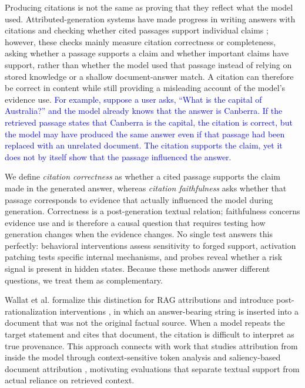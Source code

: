 \documentclass[a4paper,fleqn]{cas-sc}
\begin{document}
Producing citations is not the same as proving that they reflect what the model used. Attributed-generation systems have made progress in writing answers with citations and checking whether cited passages support individual claims \cite{gao2023citations,liu2023verifiability}; however, these checks mainly measure citation correctness or completeness, asking whether a passage supports a claim and whether important claims have support, rather than whether the model used that passage instead of relying on stored knowledge or a shallow document-answer match. A citation can therefore be correct in content while still providing a misleading account of the model's evidence use. \textcolor{blue}{For example, suppose a user asks, ``What is the capital of Australia?'' and the model already knows that the answer is Canberra. If the retrieved passage states that Canberra is the capital, the citation is correct, but the model may have produced the same answer even if that passage had been replaced with an unrelated document. The citation supports the claim, yet it does not by itself show that the passage influenced the answer.}

We define \emph{citation correctness} as whether a cited passage supports the claim made in the generated answer, whereas \emph{citation faithfulness} asks whether that passage corresponds to evidence that actually influenced the model during generation. Correctness is a post-generation textual relation; faithfulness concerns evidence use and is therefore a causal question that requires testing how generation changes when the evidence changes. No single test answers this perfectly: behavioral interventions assess sensitivity to forged support, activation patching tests specific internal mechanisms, and probes reveal whether a risk signal is present in hidden states. Because these methods answer different questions, we treat them as complementary.

Wallat et al. formalize this distinction for RAG attributions and introduce post-rationalization interventions \cite{wallat2025correctness}, in which an answer-bearing string is inserted into a document that was not the original factual source. When a model repeats the target statement and cites that document, the citation is difficult to interpret as true provenance. This approach connects with work that studies attribution from inside the model through context-sensitive token analysis and saliency-based document attribution \cite{qi2024mirage}, motivating evaluations that separate textual support from actual reliance on retrieved context.
\end{document}

